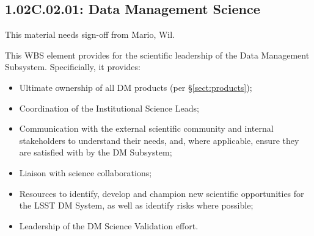 \subsection{1.02C.02.01: Data Management Science}

\begin{note}
This material needs sign-off from Mario, Wil.
\end{note}

This WBS element provides for the scientific leadership of the Data Management
Subsystem. Specificially, it provides:

\begin{itemize}

  \item{Ultimate ownership of all DM products (per \S\ref{sect:products});}

  \item{Coordination of the Institutional Science Leads;}

  \item{Communication with the external scientific community and internal
  stakeholders to understand their needs, and, where applicable, ensure they
  are satisfied with by the DM Subsystem;}

  \item{Liaison with science collaborations;}

  \item{Resources to identify, develop and champion new scientific
  opportunities for the LSST DM System, as well as identify risks where
  possible;}

  \item{Leadership of the DM Science Validation effort.}

\end{itemize}

